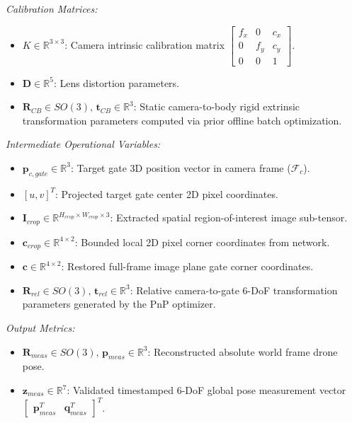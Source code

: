 \documentclass{article}
\begin{document}
\noindent\textit{Calibration Matrices:}
\begin{itemize}
    \item $K \in \mathbb{R}^{3 \times 3}$: Camera intrinsic calibration matrix $\begin{bmatrix} f_x & 0 & c_x \\ 0 & f_y & c_y \\ 0 & 0 & 1 \end{bmatrix}$.
    \item $\mathbf{D} \in \mathbb{R}^5$: Lens distortion parameters.
    \item $\mathbf{R}_{CB} \in SO(3), \, \mathbf{t}_{CB} \in \mathbb{R}^3$: Static camera-to-body rigid extrinsic transformation parameters computed via prior offline batch optimization.
\end{itemize}

\noindent\textit{Intermediate Operational Variables:}
\begin{itemize}
    \item $\mathbf{p}_{c, gate} \in \mathbb{R}^3$: Target gate 3D position vector in camera frame ($\mathcal{F}_c$).
    \item $[u, v]^T$: Projected target gate center 2D pixel coordinates.
    \item $\mathbf{I}_{crop} \in \mathbb{R}^{H_{crop} \times W_{crop} \times 3}$: Extracted spatial region-of-interest image sub-tensor.
    \item $\mathbf{c}_{crop} \in \mathbb{R}^{4 \times 2}$: Bounded local 2D pixel corner coordinates from network.
    \item $\mathbf{c} \in \mathbb{R}^{4 \times 2}$: Restored full-frame image plane gate corner coordinates.
    \item $\mathbf{R}_{rel} \in SO(3), \, \mathbf{t}_{rel} \in \mathbb{R}^3$: Relative camera-to-gate 6-DoF transformation parameters generated by the PnP optimizer.
\end{itemize}

\noindent\textit{Output Metrics:}
\begin{itemize}
    \item $\mathbf{R}_{meas} \in SO(3), \, \mathbf{p}_{meas} \in \mathbb{R}^3$: Reconstructed absolute world frame drone pose.
    \item $\mathbf{z}_{meas} \in \mathbb{R}^7$: Validated timestamped 6-DoF global pose measurement vector $\begin{bmatrix} \mathbf{p}_{meas}^T & \mathbf{q}_{meas}^T \end{bmatrix}^T$.
\end{itemize}
\end{document}
